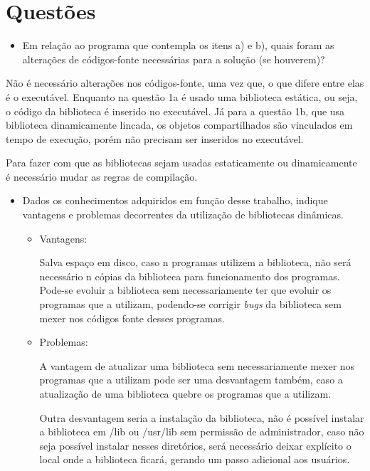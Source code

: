 \chapter[Questões]{Questões}

\begin{itemize}
	\item Em relação ao programa que contempla os itens a) e b), quais foram as alterações
	de códigos-fonte necessárias para a solução (se houverem)?
\end{itemize}

Não é necessário alterações nos códigos-fonte, uma vez que, o que difere entre elas é o executável. Enquanto na 	questão 1a é usado uma biblioteca estática, ou seja, o código da biblioteca é inserido no executável. Já para a questão 1b, que usa biblioteca dinamicamente lincada, os objetos compartilhados são vinculados em tempo de execução, porém não precisam ser inseridos no executável.

Para fazer com que as bibliotecas sejam usadas estaticamente ou dinamicamente é necessário mudar as regras de compilação.

\begin{itemize}
	\item Dados os conhecimentos adquiridos em função desse trabalho, indique vantagens e problemas decorrentes da utilização de bibliotecas dinâmicas.

	\begin{itemize}

	\item Vantagens:

	Salva espaço em disco, caso n programas utilizem a biblioteca, não será necessário n cópias da biblioteca para funcionamento dos programas.
	Pode-se evoluir a biblioteca sem necessariamente ter que evoluir os programas que a utilizam, podendo-se corrigir \textit{bugs} da biblioteca sem mexer nos códigos fonte desses programas.

	\item Problemas:

	A vantagem de atualizar uma biblioteca sem necessariamente mexer nos programas que a utilizam pode ser uma desvantagem também, caso a atualização de uma biblioteca quebre os programas que a utilizam.

	Outra desvantagem seria a instalação da biblioteca, não é possível instalar a biblioteca em /lib ou /usr/lib sem permissão de administrador, caso não seja possível instalar nesses diretórios, será necessário deixar explícito o local onde a biblioteca ficará, gerando um passo adicional aos usuários.

	\end{itemize}

\end{itemize}


